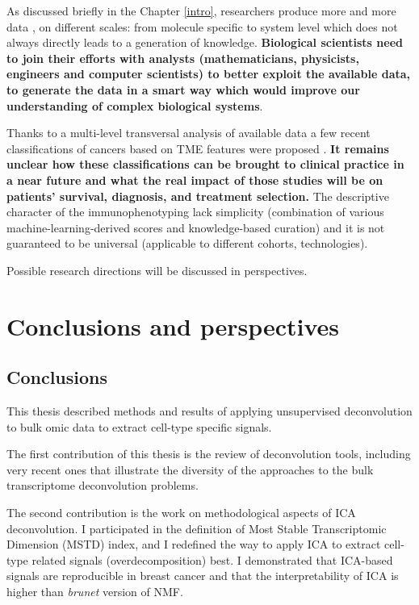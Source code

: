 \documentclass[12pt,]{book}
\theoremstyle{definition}
\theoremstyle{definition}
\theoremstyle{definition}
\theoremstyle{remark}
\begin{document}
As discussed briefly in the Chapter \ref{intro}, researchers produce
more and more data \citep{Angerer2017, Maia2017}, on different scales:
from molecule specific to system level which does not always directly
leads to a generation of knowledge. \textbf{Biological scientists need
to join their efforts with analysts (mathematicians, physicists,
engineers and computer scientists) to better exploit the available data,
to generate the data in a smart way which would improve our
understanding of complex biological systems}.

Thanks to a multi-level transversal analysis of available data a few
recent classifications of cancers based on TME features were proposed
\citep{Bindea2011, Charoentong2017, Thorsson2018, Tamborero2018}.
\textbf{It remains unclear how these classifications can be brought to
clinical practice in a near future and what the real impact of those
studies will be on patients' survival, diagnosis, and treatment
selection.} The descriptive character of the immunophenotyping lack
simplicity (combination of various machine-learning-derived scores and
knowledge-based curation) and it is not guaranteed to be universal
(applicable to different cohorts, technologies).

Possible research directions will be discussed in perspectives.

\hypertarget{conclusions}{%
\chapter{Conclusions and perspectives}\label{conclusions}}

\hypertarget{conclusions-1}{%
\section{Conclusions}\label{conclusions-1}}

This thesis described methods and results of applying unsupervised
deconvolution to bulk omic data to extract cell-type specific signals.

The first contribution of this thesis is the review of deconvolution
tools, including very recent ones that illustrate the diversity of the
approaches to the bulk transcriptome deconvolution problems.

The second contribution is the work on methodological aspects of ICA
deconvolution. I participated in the definition of Most Stable
Transcriptomic Dimension (MSTD) index, and I redefined the way to apply
ICA to extract cell-type related signals (overdecomposition) best. I
demonstrated that ICA-based signals are reproducible in breast cancer
and that the interpretability of ICA is higher than \emph{brunet}
version of NMF.
\end{document}
